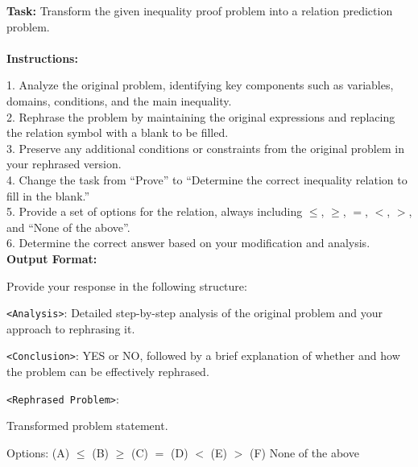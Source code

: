 \begin{textcolorbox}
\textbf{Task:} Transform the given inequality proof problem into a relation prediction problem.
\\\\
\textbf{Instructions:}

1. Analyze the original problem, identifying key components such as variables, domains, conditions, and the main inequality. \\
2. Rephrase the problem by maintaining the original expressions and replacing the relation symbol with a blank to be filled. \\
3. Preserve any additional conditions or constraints from the original problem in your rephrased version. \\
4. Change the task from ``Prove'' to ``Determine the correct inequality relation to fill in the blank.'' \\
5. Provide a set of options for the relation, always including $\leq$, $\geq$, $=$, $<$, $>$, and ``None of the above''. \\
6. Determine the correct answer based on your modification and analysis. \\

\textbf{Output Format:}

Provide your response in the following structure:

\vspace{2mm}
\texttt{<Analysis>}: Detailed step-by-step analysis of the original problem and your approach to rephrasing it.

\vspace{2mm}
\texttt{<Conclusion>}: YES or NO, followed by a brief explanation of whether and how the problem can be effectively rephrased.

\vspace{2mm}
\texttt{<Rephrased Problem>}: 

\quad Transformed problem statement.

\quad Options:
(A) $\leq$ \quad
(B) $\geq$\quad
(C) $=$ \quad
(D) $<$ \quad
(E) $>$ \quad
(F) None of the above


\end{textcolorbox}
